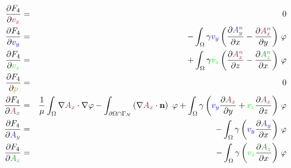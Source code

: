 \documentclass[smallextended]{svjour3}       %
\begin{document}
		\begin{eqnarray}
		\frac{\partial F_4}{\partial \textcolor{red}{v_x}} & = & 0 \\
		\frac{\partial F_4}{\partial \textcolor{blue}{v_y}} & = &
		-\int_{\Omega} \gamma \textcolor{blue}{v_y} \left(\frac{\partial \textcolor{darkBlue}{A_y^n}}{\partial x} - \frac{\partial \textcolor{darkRed}{A_x^n}}{\partial y}\right)\,\varphi  \\
		\frac{\partial F_4}{\partial \textcolor{green}{v_z}} & = &
		+\int_{\Omega} \gamma \textcolor{green}{v_z} \left(\frac{\partial \textcolor{darkRed}{A_x^n}}{\partial z} - \frac{\partial \textcolor{darkGreen}{A_z^n}}{\partial x}\right)\,\varphi\\
		\frac{\partial F_4}{\partial \textcolor{orange}{p}} & = & 0 \\
		\frac{\partial F_4}{\partial \textcolor{darkRed}{A_x}} & = & 
		\frac{1}{\mu}\int_{\Omega}\nabla \textcolor{darkRed}{A_x} \cdot \nabla \varphi - \int_{\partial \Omega \cap \Gamma_{N}} \left(\nabla \textcolor{darkRed}{A_x}\cdot \mathbf{n}\right)\ \varphi 
			 + \int_{\Omega} \gamma \left(\textcolor{blue}{v_y} \frac{\partial \textcolor{darkRed}{A_x}}{\partial y} + \textcolor{green}{v_z} \frac{\partial \textcolor{darkRed}{A_x}}{\partial z}\right)\,\varphi\\
		\frac{\partial F_4}{\partial \textcolor{darkBlue}{A_y}} & = & 
		-  \int_{\Omega} \gamma \left(\textcolor{blue}{v_y} \frac{\partial \textcolor{darkBlue}{A_y}}{\partial x}\right)\,\varphi\\
		\frac{\partial F_4}{\partial \textcolor{darkGreen}{A_z}} & = & 
		-  \int_{\Omega} \gamma \left(\textcolor{green}{v_z} \frac{\partial \textcolor{darkGreen}{A_z}}{\partial x}\right)\,\varphi
		\end{eqnarray}
		
\end{document}
